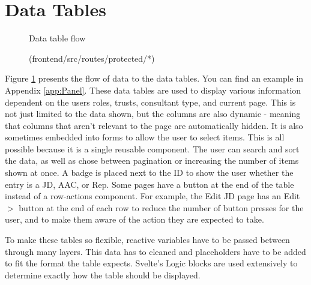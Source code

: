 \section{Data Tables} \label{Data Tables}
\begin{figure}[h]
\centering
{}
\vspace{-20pt}
\caption{Data table flow}
\vspace{-10pt}
\caption*{(frontend/src/routes/protected/*)}
\label{fig:data-table-flow}
\vspace{-5pt}
\end{figure}

Figure \ref{fig:data-table-flow} presents the flow of data to the data tables. You can find an example in Appendix \ref{app:Panel}. These data tables are used to display various information dependent on the users roles, trusts, consultant type, and current page. This is not just limited to the data shown, but the columns are also dynamic - meaning that columns that aren't relevant to the page are automatically hidden. It is also sometimes embedded into forms to allow the user to select items. This is all possible because it is a single reusable component. The user can search and sort the data, as well as chose between pagination or increasing the number of items shown at once. A badge is placed next to the ID to show the user whether the entry is a JD, AAC, or Rep. Some pages have a button at the end of the table instead of a row-actions component. For example, the Edit JD page has an Edit $>$ button at the end of each row to reduce the number of button presses for the user, and to make them aware of the action they are expected to take.

To make these tables so flexible, reactive variables have to be passed between through many layers. This data has to cleaned and placeholders have to be added to fit the format the table expects. Svelte's Logic blocks are used extensively to determine exactly how the table should be displayed.


